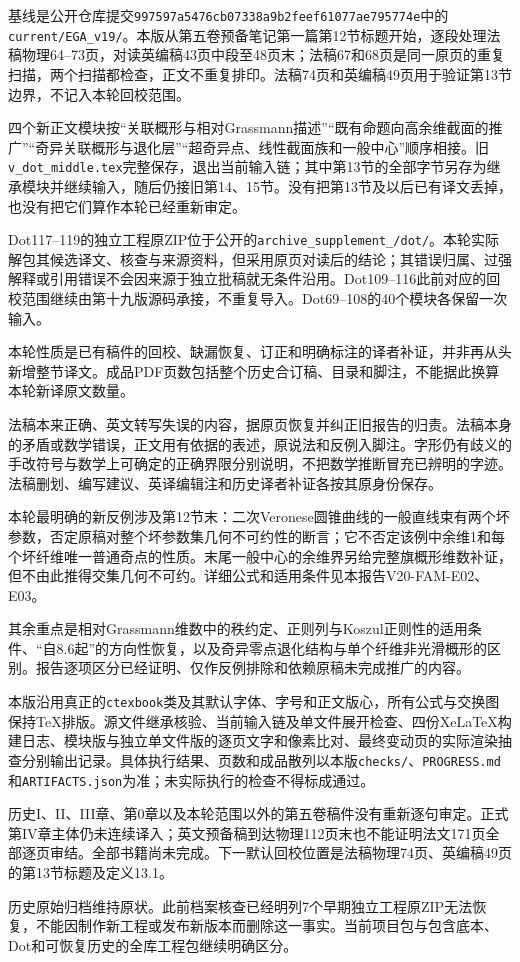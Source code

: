 基线是公开仓库提交\texttt{997597a5476cb07338a9b2feef61077ae795774e}中的\texttt{current/EGA\_v19/}。本版从第五卷预备笔记第一篇第12节标题开始，逐段处理法稿物理64--73页，对读英编稿43页中段至48页末；法稿67和68页是同一原页的重复扫描，两个扫描都检查，正文不重复排印。法稿74页和英编稿49页用于验证第13节边界，不记入本轮回校范围。

四个新正文模块按“关联概形与相对Grassmann描述”“既有命题向高余维截面的推广”“奇异关联概形与退化层”“超奇异点、线性截面族和一般中心”顺序相接。旧\texttt{v\_dot\_middle.tex}完整保存，退出当前输入链；其中第13节的全部字节另存为继承模块并继续输入，随后仍接旧第14、15节。没有把第13节及以后已有译文丢掉，也没有把它们算作本轮已经重新审定。

Dot117--119的独立工程原ZIP位于公开的\texttt{archive\_\allowbreak supplement\_/\allowbreak dot/}。本轮实际解包其候选译文、核查与来源资料，但采用原页对读后的结论；其错误归属、过强解释或引用错误不会因来源于独立批稿就无条件沿用。Dot109--116此前对应的回校范围继续由第十九版源码承接，不重复导入。Dot69--108的40个模块各保留一次输入。

本轮性质是已有稿件的回校、缺漏恢复、订正和明确标注的译者补证，并非再从头新增整节译文。成品PDF页数包括整个历史合订稿、目录和脚注，不能据此换算本轮新译原文数量。

法稿本来正确、英文转写失误的内容，据原页恢复并纠正旧报告的归责。法稿本身的矛盾或数学错误，正文用有依据的表述，原说法和反例入脚注。字形仍有歧义的手改符号与数学上可确定的正确界限分别说明，不把数学推断冒充已辨明的字迹。法稿删划、编写建议、英译编辑注和历史译者补证各按其原身份保存。

本轮最明确的新反例涉及第12节末：二次Veronese圆锥曲线的一般直线束有两个坏参数，否定原稿对整个坏参数集几何不可约性的断言；它不否定该例中余维1和每个坏纤维唯一普通奇点的性质。末尾一般中心的余维界另给完整旗概形维数补证，但不由此推得交集几何不可约。详细公式和适用条件见本报告V20-FAM-E02、E03。

其余重点是相对Grassmann维数中的秩约定、正则列与Koszul正则性的适用条件、“自8.6起”的方向性恢复，以及奇异零点退化结构与单个纤维非光滑概形的区别。报告逐项区分已经证明、仅作反例排除和依赖原稿未完成推广的内容。

本版沿用真正的\texttt{ctexbook}类及其默认字体、字号和正文版心，所有公式与交换图保持TeX排版。源文件继承核验、当前输入链及单文件展开检查、四份XeLaTeX构建日志、模块版与独立单文件版的逐页文字和像素比对、最终变动页的实际渲染抽查分别输出记录。具体执行结果、页数和成品散列以本版\texttt{checks/}、\texttt{PROGRESS.md}和\texttt{ARTIFACTS.json}为准；未实际执行的检查不得标成通过。

历史I、II、III章、第0章以及本轮范围以外的第五卷稿件没有重新逐句审定。正式第IV章主体仍未连续译入；英文预备稿到达物理112页末也不能证明法文171页全部逐页审结。全部书籍尚未完成。下一默认回校位置是法稿物理74页、英编稿49页的第13节标题及定义13.1。

历史原始归档维持原状。此前档案核查已经明列7个早期独立工程原ZIP无法恢复，不能因制作新工程或发布新版本而删除这一事实。当前项目包与包含底本、Dot和可恢复历史的全库工程包继续明确区分。
